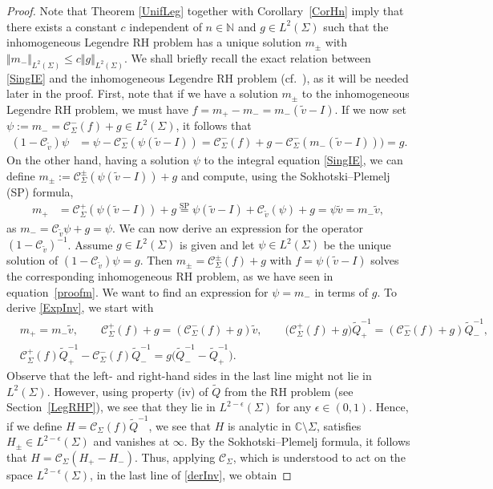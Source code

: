\documentclass[11pt]{article}
\numberwithin{equation}{section}
\newcommand{\C}{\mathbb{C}}
\newcommand{\Id}{I}
\newcommand{\tQ}{{\widetilde Q}}
\newcommand{\tv}{{\widetilde v}}
\newcommand{\Cau}{\mathcal C_{\Sigma}}
\newcommand{\Cautv}{\mathcal C_{\tv}}
\newcommand{\Ltwo}{L^2(\Sigma)}
\numberwithin{equation}{section}
\begin{document}
\begin{proof}
Note that Theorem \ref{UnifLeg} together with Corollary~\ref{CorHn} imply that there exists a constant $c$ independent of $n\in \mathbb{N}$ and $g\in \Ltwo$ such that the inhomogeneous Legendre RH problem has a unique solution $m_\pm$ with $\Vert m_- \Vert_{\Ltwo} \leq c\Vert g \Vert_{\Ltwo}$. We shall briefly recall the exact relation between \eqref{SingIE} and the inhomogeneous Legendre RH problem (cf.\ \cite[Section~2]{DZSob}), as it will be needed later in the proof. First, note that if we have a solution $m_\pm$ to the inhomogeneous Legendre RH problem, we must have $f = m_+ - m_- = m_-(\tv-\Id)$. If we now set $\psi := m_- = \Cau^-(f)+g \in \Ltwo$, it follows that
\begin{align*}
 (1-\Cautv)\psi &= \psi - \Cau^-(\psi (\tv-\Id))= \Cau^-(f) + g - \Cau^-(m_-(\tv-\Id)))= g.
\end{align*}
On the other hand, having a solution $\psi$ to the integral equation \eqref{SingIE}, we can define $m_\pm := \Cau^\pm(\psi (\tv-\Id)) + g$ and compute, using the Sokhotski--Plemelj (SP) formula,
\begin{align}\label{proofm}
 m_+ &= \Cau^+(\psi (\tv-\Id)) + g\overset{\text{SP}}{=} \psi (\tv-\Id) + \Cautv(\psi) + g= \psi \tv= m_- \tv,
\end{align}
as $m_- = \Cautv \psi + g = \psi$.
We can now derive an expression for the operator $(1 - \Cautv)^{-1}$. Assume $g \in \Ltwo$ is given and let $\psi \in \Ltwo$ be the unique solution of $(1-\Cautv)\psi = g$. Then $m_\pm = \Cau^\pm(f)+g$ with $f = \psi (\tv-\Id)$ solves the corresponding inhomogeneous RH problem, as we have seen in equation~\eqref{proofm}. We want to find an expression for $\psi = m_-$ in terms of $g$. To derive \eqref{ExpInv}, we start with
\begin{align}
& m_+ = m_- \tv, \qquad
 \Cau^+(f) + g = (\Cau^-(f) + g)\tilde v,\qquad \big(\Cau^+(f) + g\big)\tQ_+^{-1} = (\Cau^-(f) + g)\tQ_-^{-1},\nonumber
 \\
& \Cau^+(f)\tQ_+^{-1} - \Cau^-(f)\tQ_-^{-1} = g\big(\tQ_-^{-1}-\tQ_+^{-1}\big).\label{derInv}
 \end{align}
Observe that the left- and right-hand sides in the last line might not lie in $L^2(\Sigma)$. However, using property (iv) of $\tQ$ from the RH problem (see Section~\ref{LegRHP}), we see that they lie in $L^{2-\epsilon}(\Sigma)$ for any $\epsilon \in (0,1)$. Hence, if we define $H = \Cau(f) \tQ^{-1}$, we see that $H$ is analytic in $\C \setminus \Sigma$, satisfies $H_\pm \in L^{2-\epsilon}(\Sigma)$ and vanishes at $\infty$. By the Sokhotski--Plemelj formula, it follows that $H = \Cau(H_+-H_-)$. Thus, applying $\Cau$, which is understood to act on the space $L^{2-\epsilon}(\Sigma)$, in the last line of \eqref{derInv}, we obtain

\end{proof}
\end{document}
